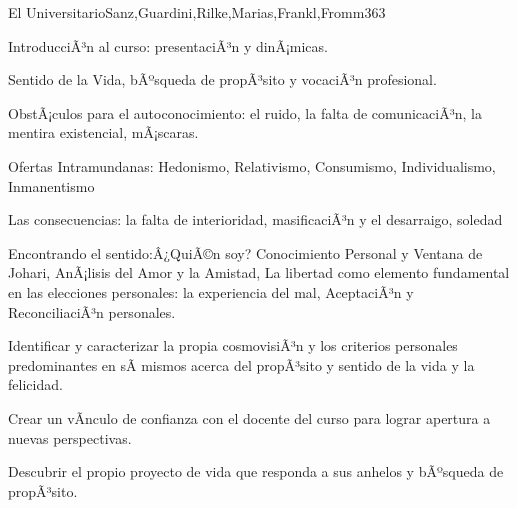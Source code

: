 \begin{syllabus}
\begin{unit}{El Universitario}{Sanz,Guardini,Rilke,Marias,Frankl,Fromm}{36}{3}
\begin{topics}
	\item IntroducciÃ³n al curso: presentaciÃ³n y dinÃ¡micas.
	\item Sentido de la Vida, bÃºsqueda de propÃ³sito y vocaciÃ³n profesional.
	\item ObstÃ¡culos para el autoconocimiento: el ruido, la falta de comunicaciÃ³n, la mentira existencial, mÃ¡scaras.
	\item Ofertas Intramundanas: Hedonismo, Relativismo, Consumismo, Individualismo, Inmanentismo
	\item Las consecuencias: la falta de interioridad, masificaciÃ³n y el desarraigo, soledad
	\item Encontrando el sentido:Â¿QuiÃ©n soy? Conocimiento Personal y Ventana de Johari, AnÃ¡lisis del Amor y la Amistad, La libertad como elemento fundamental en las elecciones personales: la experiencia del mal, AceptaciÃ³n y ReconciliaciÃ³n personales.
\end{topics}
\begin{unitgoals}
	\item Identificar y caracterizar la propia cosmovisiÃ³n y los criterios personales predominantes en sÃ­ mismos acerca del propÃ³sito y sentido de la vida y la felicidad.
	\item Crear un vÃ­nculo de confianza con el docente del curso para lograr apertura a nuevas perspectivas.
	\item Descubrir el propio proyecto de vida que responda a sus anhelos y bÃºsqueda de propÃ³sito.
\end{unitgoals}
\end{unit}


\end{syllabus}
